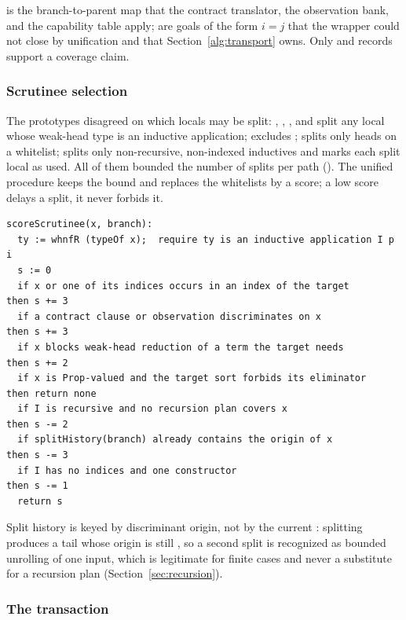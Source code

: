  is the branch-to-parent map that the contract translator, the observation bank, and the capability table apply;  are goals of the form $i = j$ that the wrapper could not close by unification and that Section~\ref{alg:transport} owns. Only  and  records support a coverage claim.

\subsubsection{Scrutinee selection}

The prototypes disagreed on which locals may be split: , , , and  split any local whose weak-head type is an inductive application;  excludes ;  splits only heads on a whitelist;  splits only non-recursive, non-indexed inductives and marks each split local as used. All of them bounded the number of splits per path (). The unified procedure keeps the bound and replaces the whitelists by a score; a low score delays a split, it never forbids it.

\begin{lstlisting}
scoreScrutinee(x, branch):
  ty := whnfR (typeOf x);  require ty is an inductive application I p i
  s := 0
  if x or one of its indices occurs in an index of the target      then s += 3
  if a contract clause or observation discriminates on x           then s += 3
  if x blocks weak-head reduction of a term the target needs       then s += 2
  if x is Prop-valued and the target sort forbids its eliminator   then return none
  if I is recursive and no recursion plan covers x                 then s -= 2
  if splitHistory(branch) already contains the origin of x         then s -= 3
  if I has no indices and one constructor                          then s -= 1
  return s
\end{lstlisting}

Split history is keyed by discriminant origin, not by the current : splitting  produces a tail whose origin is still , so a second split is recognized as bounded unrolling of one input, which is legitimate for finite cases and never a substitute for a recursion plan (Section~\ref{sec:recursion}).

\subsubsection{The transaction}

